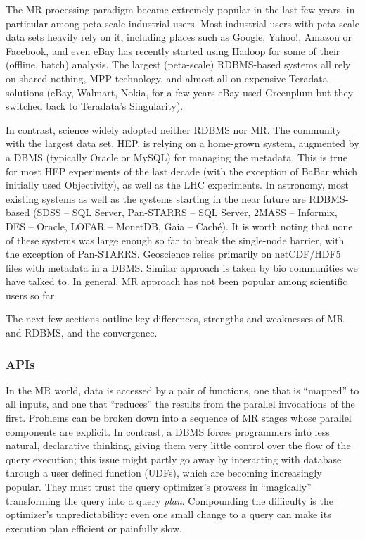 \documentclass[DM,lsstdraft,toc]{lsstdoc}
\begin{document}
The MR processing paradigm became extremely popular in the last few
years, in particular among peta-scale industrial users. Most industrial
users with peta-scale data sets heavily rely on it, including places
such as Google, Yahoo!, Amazon or Facebook, and even eBay has recently
started using Hadoop for some of their (offline, batch) analysis. The
largest (peta-scale) RDBMS-based systems all rely on shared-nothing, MPP
technology, and almost all on expensive Teradata solutions (eBay,
Walmart, Nokia, for a few years eBay used Greenplum but they switched
back to Teradata's Singularity).

In contrast, science widely adopted neither RDBMS nor MR. The community
with the largest data set, HEP, is relying on a home-grown system,
augmented by a DBMS (typically Oracle or MySQL) for managing the
metadata. This is true for most HEP experiments of the last decade (with
the exception of BaBar which initially used Objectivity), as well as the
LHC experiments. In astronomy, most existing systems as well as the
systems starting in the near future are RDBMS-based (SDSS -- SQL Server,
Pan-STARRS -- SQL Server, 2MASS -- Informix, DES -- Oracle, LOFAR --
MonetDB, Gaia -- Caché). It is worth noting that none of these systems
was large enough so far to break the single-node barrier, with the
exception of Pan-STARRS. Geoscience relies primarily on netCDF/HDF5
files with metadata in a DBMS. Similar approach is taken by bio
communities we have talked to. In general, MR approach has not been
popular among scientific users so far.

The next few sections outline key differences, strengths and weaknesses
of MR and RDBMS, and the convergence.

\subsubsection{APIs}\label{apis}

In the MR world, data is accessed by a pair of functions, one that is
``mapped'' to all inputs, and one that ``reduces'' the results from the
parallel invocations of the first. Problems can be broken down into a
sequence of MR stages whose parallel components are explicit. In
contrast, a DBMS forces programmers into less natural, declarative
thinking, giving them very little control over the flow of the query
execution; this issue might partly go away by interacting with database
through a user defined function (UDFs), which are becoming increasingly
popular. They must trust the query optimizer's prowess in ``magically''
transforming the query into a query \emph{plan}. Compounding the
difficulty is the optimizer's unpredictability: even one small change to
a query can make its execution plan efficient or painfully slow.
\end{document}
